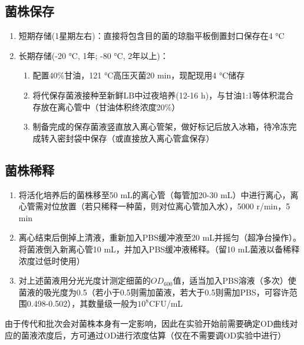 \documentclass[
]{book}
\providecommand{\tightlist}{%
  \setlength{\itemsep}{0pt}\setlength{\parskip}{0pt}}
\begin{document}
\hypertarget{ux83ccux682aux4fddux5b58}{%
\subsection{菌株保存}\label{ux83ccux682aux4fddux5b58}}

\begin{enumerate}
\def\labelenumi{\arabic{enumi}.}
\tightlist
\item
  短期存储(1星期左右)：直接将包含目的菌的琼脂平板倒置封口保存在4 °C
\item
  长期存储(-20 °C, 1年; -80 °C, 2年以上)：

  \begin{enumerate}
  \def\labelenumii{\arabic{enumii}.}
  \tightlist
  \item
    配置40\%甘油，121 °C高压灭菌20 min，现配现用4 °C储存
  \item
    将代保存菌液接种至新鲜LB中过夜培养(12-16
    h)，与甘油1:1等体积混合存放在离心管中（甘油体积终浓度20\%）
  \item
    制备完成的保存菌液竖直放入离心管架，做好标记后放入冰箱，待冷冻完成转入密封袋中保存（或直接放入离心管盒保存）
  \end{enumerate}
\end{enumerate}

\hypertarget{ux83ccux682aux7a00ux91ca}{%
\subsection{菌株稀释}\label{ux83ccux682aux7a00ux91ca}}

\begin{enumerate}
\def\labelenumi{\arabic{enumi}.}
\tightlist
\item
  将活化培养后的菌株移至50 mL的离心管（每管加20-30
  mL）中进行离心，离心管需对位放置（若只稀释一种菌，则对位离心管加入水），5000
  r/min，5 min
\item
  离心结束后倒掉上清液，重新加入PBS缓冲液至20
  mL并摇匀（超净台操作）。将菌液倒入新离心管10
  mL，并加入PBS缓冲液稀释。（留10 mL菌液以备稀释浓度过低时使用）
\item
  对上述菌液用分光光度计测定细菌的\(OD_{600}\)值，适当加入PBS溶液（多次）使菌液的吸光度为0.5（若小于0.5则需加菌液，若大于0.5则需加PBS，可容许范围0.498-0.502），其数量级一般为\(10^8\)CFU/mL
\end{enumerate}

由于传代和批次会对菌株本身有一定影响，因此在实验开始前需要确定OD曲线对应的菌液浓度后，方可通过OD进行浓度估算（仅在不需要调OD实验中进行）
\end{document}
